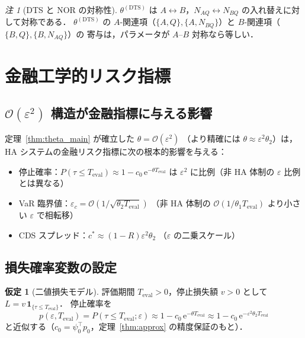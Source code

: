 \documentclass[12pt,a4paper]{article}
\theoremstyle{plain}
\theoremstyle{definition}
\newtheorem{assumption}[theorem]{仮定}
\theoremstyle{remark}
\newtheorem{remark}[theorem]{注}
\newcommand{\calO}{\mathcal{O}}        %
\newcommand{\eps}{\varepsilon}         %
\newcommand{\e}{\mathrm{e}}            %
\newcommand{\thetaDTS}{\theta^{(\mathrm{DTS})}}
\begin{document}
\begin{remark}[DTS と NOR の対称性]
  $\thetaDTS$ は $A \leftrightarrow B$，$N_{AQ} \leftrightarrow N_{BQ}$ の入れ替えに対して対称である．
  $\thetaDTS$ の $A$-関連項（$\{A,Q\},\{A,N_{BQ}\}$）と $B$-関連項（$\{B,Q\},\{B,N_{AQ}\}$）の
  寄与は，パラメータが $A$–$B$ 対称なら等しい．
\end{remark}

\section{金融工学的リスク指標}\label{sec:risk}

\subsection{$\calO(\eps^2)$ 構造が金融指標に与える影響}

定理~\ref{thm:theta_main} が確立した $\theta = \calO(\eps^2)$
（より精確には $\theta \approx \eps^2\theta_2$）は，
HA システムの金融リスク指標に次の根本的影響を与える：
\begin{itemize}
  \item 停止確率：$P(\tau\le T_{\mathrm{eval}})
    \approx 1 - c_0\,\e^{-\theta T_{\mathrm{eval}}}$
    は $\eps^2$ に比例（非 HA 体制の $\eps$ 比例とは異なる）
  \item VaR 臨界値：$\eps_c = \calO(1/\sqrt{\theta_2 T_{\mathrm{eval}}})$
    （非 HA 体制の $\calO(1/\theta_1 T_{\mathrm{eval}})$ より小さい $\eps$ で相転移）
  \item CDS スプレッド：$c^* \approx (1-R)\eps^2\theta_2$
    （$\eps$ の二乗スケール）
\end{itemize}

\subsection{損失確率変数の設定}

\begin{assumption}[二値損失モデル]\label{ass:loss}
  評価期間 $T_{\mathrm{eval}}>0$，停止損失額 $v>0$ として
  $L = v\,\mathbf{1}_{\{\tau\le T_{\mathrm{eval}}\}}$．
  停止確率を
  \[
    p(\eps,T_{\mathrm{eval}})
    = P(\tau\le T_{\mathrm{eval}};\eps)
    \approx 1 - c_0\,\e^{-\theta T_{\mathrm{eval}}}
    \approx 1 - c_0\,\e^{-\eps^2\theta_2 T_{\mathrm{eval}}}
  \]
  と近似する（$c_0 = \psi_0^\top p_0$，定理~\ref{thm:approx} の精度保証のもと）．
\end{assumption}
\end{document}
